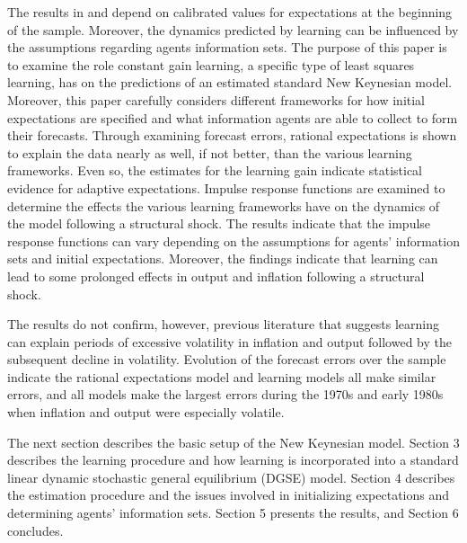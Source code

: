 The results in  and  depend on calibrated values for expectations at the beginning of the sample.  Moreover, the dynamics predicted by learning can be influenced by the assumptions regarding agents information sets.  The purpose of this paper is to examine the role constant gain learning, a specific type of least squares learning, has on the predictions of an estimated standard New Keynesian model.  Moreover, this paper carefully considers different frameworks for how initial expectations are specified and what information agents are able to collect to form their forecasts.  Through examining forecast errors, rational expectations is shown to explain the data nearly as well, if not better, than the various learning frameworks.   Even so, the estimates for the learning gain indicate statistical evidence for adaptive expectations.  Impulse response functions are examined to determine the effects the various learning frameworks have on the dynamics of the model following a structural shock.  The results indicate that the impulse response functions can vary depending on the assumptions for agents' information sets and initial expectations.  Moreover, the findings indicate that learning can lead to some prolonged effects in output and inflation following a structural shock.

The results do not confirm, however, previous literature that suggests learning can explain periods of excessive volatility in inflation and output followed by the subsequent decline in volatility.  Evolution of the forecast errors over the sample indicate the rational expectations model and learning models all make similar errors, and all models make the largest errors during the 1970s and early 1980s when inflation and output were especially volatile.

The next section describes the basic setup of the New Keynesian model.  Section 3 describes the learning procedure and how learning is incorporated into a standard linear dynamic stochastic general equilibrium (DGSE) model.  Section 4 describes the estimation procedure and the issues involved in initializing expectations and determining agents' information sets.  Section 5 presents the results, and Section 6 concludes.

